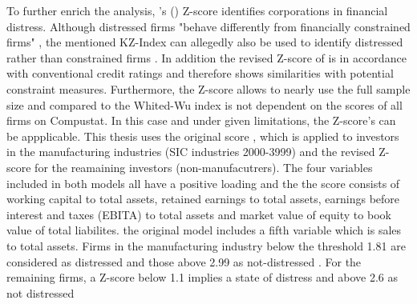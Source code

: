 \documentclass[12pt]{article}
\begin{document}
To further enrich the analysis, \citeauthor{Altman1968}'s (\citeyear{Altman1968}) Z-score identifies corporations in financial distress. Although distressed firms "behave differently from financially constrained firms" \citep[p.461]{Bhagat2005}, the mentioned KZ-Index can allegedly also be used to identify distressed rather than constrained firms \citep[p.47]{Kim2015}. In addition the revised Z-score of \citet[p.19]{Altman2002} is in accordance with conventional credit ratings and therefore shows similarities with potential constraint measures. Furthermore, the Z-score allows to nearly use the full sample size and compared to the Whited-Wu index is not dependent on the scores of all firms on Compustat. In this case and under given limitations, the Z-score's can be appplicable. This thesis uses the original score \citep[p.607]{Altman1968}, which is applied to investors in the manufacturing industries (SIC industries 2000-3999) and the revised Z-score \citep[p.17]{Altman2002} for the reamaining investors (non-manufacutrers). The four variables included in both models all have a positive loading and the the score consists of working capital to total assets, retained earnings to total assets, earnings before interest and taxes (EBITA) to total assets and market value of equity to book value of total liabilites. the original model includes a fifth variable which is sales to total assets. Firms in the manufacturing industry below the threshold 1.81 are considered as distressed and those above 2.99 as not-distressed \citep[p.14]{Altman2002}. For the remaining firms, a Z-score below 1.1 implies a state of distress and above 2.6 as not distressed \citep[p.175]{Sulub2014}\\
\end{document}
